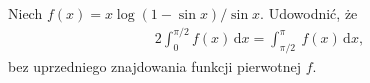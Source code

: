 %

\begin{problem}[pytanie 3490404]
    \label{stack_3490404}%
    Niech $f(x) = x \log (1 - \sin x) / \sin x$.
    Udowodnić, że
    \begin{align}
        2\int_0^{\pi/2} f(x) \,\mathrm{d}x =
        \int_{\pi/2}^\pi\ f(x) \,\mathrm{d}x,
    \end{align}
    bez uprzedniego znajdowania funkcji pierwotnej $f$.
\end{problem}

%